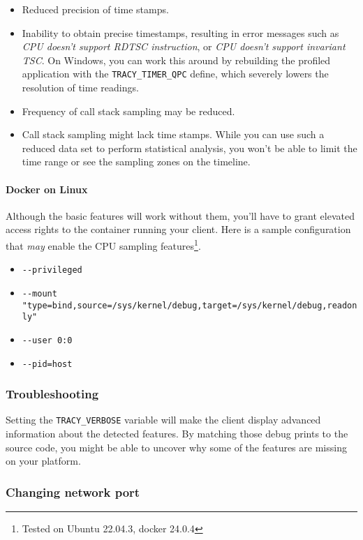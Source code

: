 \documentclass[hidelinks,titlepage,a4paper,twoside]{article}
\begin{document}
\begin{itemize}
\item Reduced precision of time stamps.
\item Inability to obtain precise timestamps, resulting in error messages such as \emph{CPU doesn't support RDTSC instruction}, or \emph{CPU doesn't support invariant TSC}. On Windows, you can work this around by rebuilding the profiled application with the \texttt{TRACY\_TIMER\_QPC} define, which severely lowers the resolution of time readings.
\item Frequency of call stack sampling may be reduced.
\item Call stack sampling might lack time stamps. While you can use such a reduced data set to perform statistical analysis, you won't be able to limit the time range or see the sampling zones on the timeline.
\end{itemize}

\paragraph{Docker on Linux}

Although the basic features will work without them, you'll have to grant elevated access rights to the container running your client. Here is a sample configuration that \textit{may} enable the CPU sampling features\footnote{Tested on Ubuntu 22.04.3, docker 24.0.4}.
\begin{itemize}
    \item \texttt{-{}-privileged}
    \item \texttt{-{}-mount "type=bind,source=/sys/kernel/debug,target=/sys/kernel/debug,readonly"}
    \item \texttt{-{}-user 0:0}
    \item \texttt{-{}-pid=host}
\end{itemize}

\subsubsection{Troubleshooting}

Setting the \texttt{TRACY\_VERBOSE} variable will make the client display advanced information about the detected features. By matching those debug prints to the source code, you might be able to uncover why some of the features are missing on your platform.

\subsubsection{Changing network port}
\end{document}
